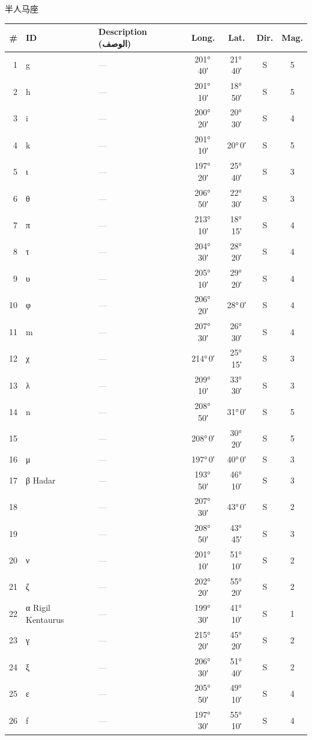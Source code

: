 \documentclass[9pt,a4paper]{extarticle}
\newcommand{\ar}[1]{{\arabicfont\textarabic{#1}}}
\begin{document}
\vspace{4pt}\quad\ar{قنطورس}\quad 半人马座
\begin{longtable}{r l >{\raggedright\arraybackslash}p{6.7cm} c c c c}
\toprule \# & ID & Description (\ar{الوصف}) & Long. & Lat. & Dir. & Mag.\\ \midrule\endhead
1 & g & \textcolor{gray}{—} & 201°\,40′ & 21°\,40′ & S & 5\\
2 & h & \textcolor{gray}{—} & 201°\,10′ & 18°\,50′ & S & 5\\
3 & i & \textcolor{gray}{—} & 200°\,20′ & 20°\,30′ & S & 4\\
4 & k & \textcolor{gray}{—} & 201°\,10′ & 20°\,0′ & S & 5\\
5 & ι & \textcolor{gray}{—} & 197°\,20′ & 25°\,40′ & S & 3\\
6 & θ & \textcolor{gray}{—} & 206°\,50′ & 22°\,30′ & S & 3\\
7 & π & \textcolor{gray}{—} & 213°\,10′ & 18°\,15′ & S & 4\\
8 & τ & \textcolor{gray}{—} & 204°\,30′ & 28°\,20′ & S & 4\\
9 & υ & \textcolor{gray}{—} & 205°\,10′ & 29°\,20′ & S & 4\\
10 & φ & \textcolor{gray}{—} & 206°\,20′ & 28°\,0′ & S & 4\\
11 & m & \textcolor{gray}{—} & 207°\,30′ & 26°\,30′ & S & 4\\
12 & χ & \textcolor{gray}{—} & 214°\,0′ & 25°\,15′ & S & 3\\
13 & λ & \textcolor{gray}{—} & 209°\,10′ & 33°\,30′ & S & 3\\
14 & n & \textcolor{gray}{—} & 208°\,50′ & 31°\,0′ & S & 5\\
15 &  & \textcolor{gray}{—} & 208°\,0′ & 30°\,20′ & S & 5\\
16 & μ & \textcolor{gray}{—} & 197°\,0′ & 40°\,0′ & S & 3\\
17 & β Hadar & \textcolor{gray}{—} & 193°\,50′ & 46°\,10′ & S & 3\\
18 &  & \textcolor{gray}{—} & 207°\,30′ & 43°\,0′ & S & 2\\
19 &  & \textcolor{gray}{—} & 208°\,50′ & 43°\,45′ & S & 3\\
20 & ν & \textcolor{gray}{—} & 201°\,10′ & 51°\,10′ & S & 2\\
21 & ζ & \textcolor{gray}{—} & 202°\,20′ & 55°\,20′ & S & 2\\
22 & α Rigil Kentaurus & \textcolor{gray}{—} & 199°\,30′ & 41°\,10′ & S & 1\\
23 & γ & \textcolor{gray}{—} & 215°\,20′ & 45°\,20′ & S & 2\\
24 & ξ & \textcolor{gray}{—} & 206°\,30′ & 51°\,40′ & S & 2\\
25 & ε & \textcolor{gray}{—} & 205°\,50′ & 49°\,10′ & S & 4\\
26 & f & \textcolor{gray}{—} & 197°\,30′ & 55°\,10′ & S & 4\\
\bottomrule\end{longtable}
\end{document}
